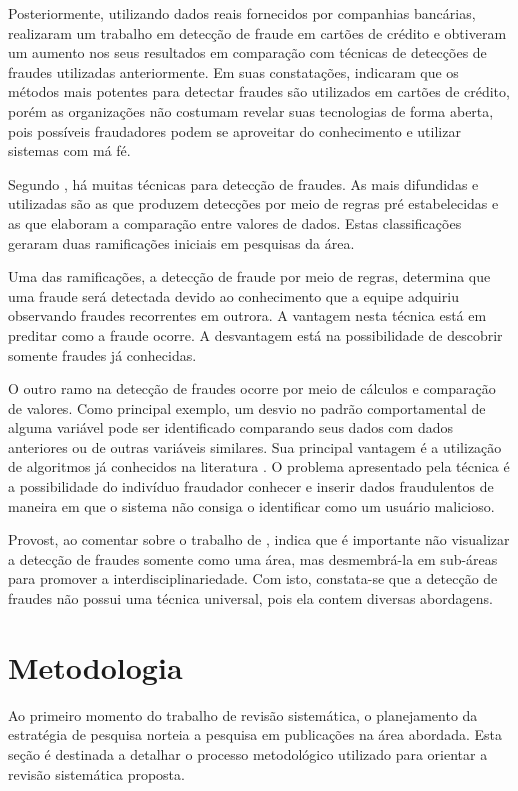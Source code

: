 \documentclass[smallextended]{svjour3}
\begin{document}
Posteriormente, utilizando dados reais fornecidos por companhias bancárias, \cite{809570} realizaram um trabalho em detecção de fraude em cartões de crédito e obtiveram um aumento nos seus resultados em comparação com técnicas de detecções de fraudes utilizadas anteriormente. Em suas constatações, indicaram que os métodos mais potentes para detectar fraudes são utilizados em cartões de crédito, porém as organizações não costumam revelar suas tecnologias de forma aberta, pois possíveis fraudadores podem se aproveitar do conhecimento e utilizar sistemas com má fé.

Segundo \cite{Fawcett1997}, há muitas técnicas para detecção de fraudes. As mais difundidas e utilizadas são as que produzem detecções por meio de regras pré estabelecidas e as que elaboram a comparação entre valores de dados. Estas classificações geraram duas ramificações iniciais em pesquisas da área.

Uma das ramificações, a detecção de fraude por meio de regras, determina que uma fraude será detectada devido ao conhecimento que a equipe adquiriu observando fraudes recorrentes em outrora. A vantagem nesta técnica está em preditar como a fraude ocorre. A desvantagem está na possibilidade de descobrir somente fraudes já conhecidas.

O outro ramo na detecção de fraudes ocorre por meio de cálculos e comparação de valores. Como principal exemplo, um desvio no padrão comportamental de alguma variável pode ser identificado comparando seus dados com dados anteriores ou de outras variáveis similares. Sua principal vantagem é a utilização de algoritmos já conhecidos na literatura \citep{Fawcett1997}. O problema apresentado pela técnica é a possibilidade do indivíduo fraudador conhecer e inserir dados fraudulentos de maneira em que o sistema não consiga o identificar como um usuário malicioso.

Provost, ao comentar sobre o trabalho de \cite{Bolton2002}, indica que é importante não visualizar a detecção de fraudes somente como uma área, mas desmembrá-la em sub-áreas para promover a interdisciplinariedade. Com isto, constata-se que a detecção de fraudes não possui uma técnica universal, pois ela contem diversas abordagens. 

\section{Metodologia}
\label{sec:3}

Ao primeiro momento do trabalho de revisão sistemática, o planejamento da estratégia de pesquisa norteia a pesquisa em publicações na área abordada. Esta seção é destinada a detalhar o processo metodológico utilizado para orientar a revisão sistemática proposta.
\end{document}
